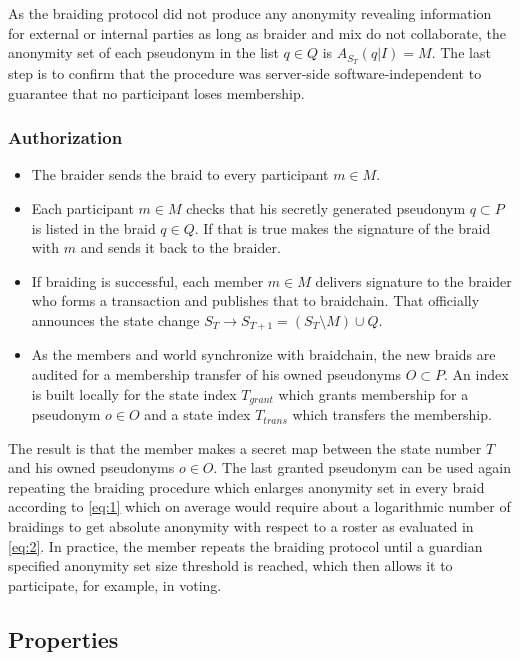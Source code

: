 \documentclass[12pt]{article}
\begin{document}
As the braiding protocol did not produce any anonymity revealing information for external or internal parties as long as braider and mix do not collaborate, the anonymity set of each pseudonym in the list $q \in Q$ is $A_{S_T}(q|I) = M$. The last step is to confirm that the procedure was server-side software-independent to guarantee that no participant loses membership.

\subsubsection*{Authorization}

\begin{itemize}
\item The braider sends the braid to every participant $m \in M$.
\item Each participant $m \in M$ checks that his secretly generated pseudonym $q \subset P$ is listed in the braid $q \in Q$. If that is true makes the signature of the braid with $m$ and sends it back to the braider.
\item If braiding is successful, each member $m \in M$ delivers signature to the braider who forms a transaction and publishes that to braidchain. That officially announces the state change $S_T \to S_{T+1} = (S_T \setminus M) \cup Q$.
\item As the members and world synchronize with braidchain, the new braids are audited for a membership transfer of his owned pseudonyms $O \subset P$. An index is built locally for the state index $T_{grant}$ which grants membership for a pseudonym $o \in O$ and a state index $T_{trans}$ which transfers the membership. 
\end{itemize}

The result is that the member makes a secret map between the state number $T$ and his owned pseudonyms $o \in O$. The last granted pseudonym can be used again repeating the braiding procedure which enlarges anonymity set in every braid according to \cref{eq:1} which on average would require about a logarithmic number of braidings to get absolute anonymity with respect to a roster as evaluated in \cref{eq:2}. In practice, the member repeats the braiding protocol until a guardian specified anonymity set size threshold is reached, which then allows it to participate, for example, in voting.


\subsection*{Properties}
\end{document}

